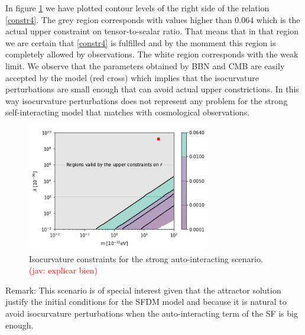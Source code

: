 \documentclass[amssymb,twocolumn,prd,nofootinbib,showpacs]{revtex4-1}
\newcommand{\jav}[1]{\textcolor{red}{(jav: #1)}}
\begin{document}
In figure \ref{constraintsSFDMls} we have plotted contour levels of the right side of the relation \eqref{constr4}. The grey region corresponds with values higher than $0.064$ which is the actual upper constraint on tensor-to-scalar ratio. That means that in that region we are certain that \eqref{constr4} is fulfilled and by the momment this region is completely allowed by observations. The white region corresponds with the weak limit. We observe that the parameters obtained by BBN and CMB are easily accepted by the model (red cross) which implies that the isocurvature perturbations are small enough that can avoid actual upper 
constrictions. In this way isocurvature perturbations does not represent any problem for the strong 
self-interacting model that matches with cosmological observations.
%
\begin{figure}
\includegraphics[width=8cm]{stronglamb.png}
\caption{Isocurvature constraints for the strong auto-interacting scenario.
\jav{explicar bien}}\label{constraintsSFDMls}
\end{figure} 

Remark: This scenario is of special interest given that the attractor solution justify the initial 
conditions for the SFDM model and because it is natural to avoid isocurvature perturbations 
when the auto-interacting term of the SF is big enough.
 
\end{document}
